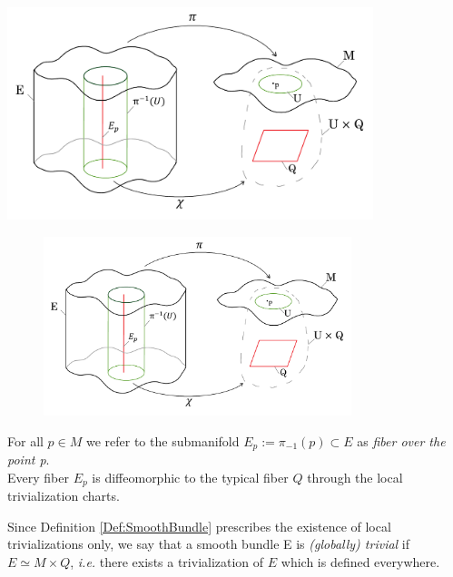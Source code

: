 \documentclass[Main]{subfiles}
\begin{document}
\ifToninus
			\begin{mdframed}
				\centering
  				\includegraphics[width=0.8\textwidth]{Pictures/fiberbundle}
			\end{mdframed}
\else
			\begin{figure}[h!]
				\centering
  				\includegraphics[width=0.8\textwidth]{Pictures/fiberbundle}
			\end{figure}
\fi
			\vspace{2mm}
				For all $p\in M$ we refer to the submanifold $E_{p} := \pi_{-1}(p) \subset E $ as \emph{fiber over the point p}.
				\\
				Every fiber $E_p$ is diffeomorphic to the typical fiber $Q$ through the local trivialization charts.

			\vspace{2mm}
				Since  Definition \ref{Def:SmoothBundle}  prescribes the existence of local trivializations only,
				we say that a smooth bundle E is \emph{(globally) trivial} if $E \simeq M \times Q$, \textit{i.e.} there exists a trivialization of $E$ which is defined everywhere.
			\vspace{3mm}
\end{document}
